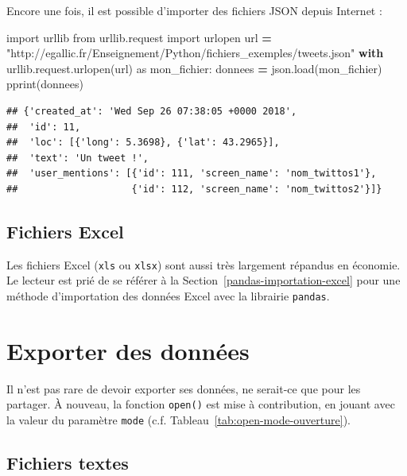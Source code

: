 \documentclass[12pt,]{book}
\newenvironment{Shaded}{\begin{snugshade}}{\end{snugshade}}
\newcommand{\StringTok}[1]{\textcolor[rgb]{0.31,0.60,0.02}{#1}}
\newcommand{\ImportTok}[1]{#1}
\newcommand{\ControlFlowTok}[1]{\textcolor[rgb]{0.13,0.29,0.53}{\textbf{#1}}}
\newcommand{\OperatorTok}[1]{\textcolor[rgb]{0.81,0.36,0.00}{\textbf{#1}}}
\newcommand{\NormalTok}[1]{#1}
\numberwithin{equation}{section}
\numberwithin{countremarque}{section}
\begin{document}
Encore une fois, il est possible d'importer des fichiers JSON depuis
Internet :

\begin{Shaded}
\begin{Highlighting}[]
\ImportTok{import}\NormalTok{ urllib}
\ImportTok{from}\NormalTok{ urllib.request }\ImportTok{import}\NormalTok{ urlopen}
\NormalTok{url }\OperatorTok{=} \StringTok{"http://egallic.fr/Enseignement/Python/fichiers_exemples/tweets.json"}
\ControlFlowTok{with}\NormalTok{ urllib.request.urlopen(url) }\ImportTok{as}\NormalTok{ mon_fichier:}
\NormalTok{   donnees }\OperatorTok{=}\NormalTok{ json.load(mon_fichier)}
\NormalTok{pprint(donnees)}
\end{Highlighting}
\end{Shaded}

\begin{lstlisting}
## {'created_at': 'Wed Sep 26 07:38:05 +0000 2018',
##  'id': 11,
##  'loc': [{'long': 5.3698}, {'lat': 43.2965}],
##  'text': 'Un tweet !',
##  'user_mentions': [{'id': 111, 'screen_name': 'nom_twittos1'},
##                    {'id': 112, 'screen_name': 'nom_twittos2'}]}
\end{lstlisting}

\subsection{Fichiers Excel}\label{fichiers-excel}

Les fichiers Excel (\texttt{xls} ou \texttt{xlsx}) sont aussi très
largement répandus en économie. Le lecteur est prié de se référer à la
Section~\ref{pandas-importation-excel} pour une méthode d'importation
des données Excel avec la librairie \texttt{pandas}.

\section{Exporter des données}\label{exporter-des-donnees}

Il n'est pas rare de devoir exporter ses données, ne serait-ce que pour
les partager. À nouveau, la fonction \texttt{open()} est mise à
contribution, en jouant avec la valeur du paramètre \texttt{mode} (c.f.
Tableau~\ref{tab:open-mode-ouverture}).

\subsection{Fichiers textes}\label{fichiers-textes}
\end{document}
